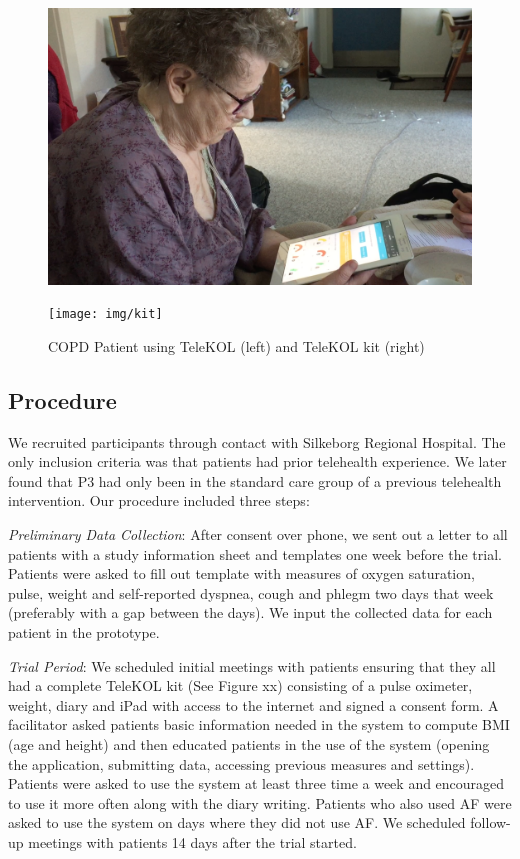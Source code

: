 \begin{figure}[!htb]
 \centering
 \begin{minipage}[b]{0.23\textwidth}
   \includegraphics[width=\textwidth]{img/AL}
 \end{minipage}
 \hfill
 \begin{minipage}[b]{0.23\textwidth}
   \texttt{[image: img/kit]}
 \end{minipage}
  \caption{COPD Patient using TeleKOL (left) and TeleKOL kit (right)}
\end{figure}


\subsection{Procedure}
We recruited participants through contact with Silkeborg Regional Hospital. The only inclusion criteria was that patients had prior telehealth experience. We later found that P3 had only been in the standard care group of a previous telehealth intervention. Our procedure included three steps: 

\textit{Preliminary Data Collection}: After consent over phone, we sent out a letter to all patients with a study information sheet and templates one week before the trial. Patients were asked to fill out template with measures of oxygen saturation, pulse, weight and self-reported dyspnea, cough and phlegm two days that week (preferably with a gap between the days). We input the collected data for each patient in the prototype. 

\textit{Trial Period}: We scheduled initial meetings with patients ensuring that they all had a complete TeleKOL kit (See Figure xx) consisting of a pulse oximeter, weight, diary and iPad with access to the internet and signed a consent form. A facilitator asked patients basic information needed in the system to compute BMI (age and height) and then educated patients in the use of the system (opening the application, submitting data, accessing previous measures and settings). Patients were asked to use the system at least three time a week and encouraged to use it more often along with the diary writing. Patients who also used AF were asked to use the system on days where they did not use AF. We scheduled follow-up meetings with patients 14 days after the trial started. 

